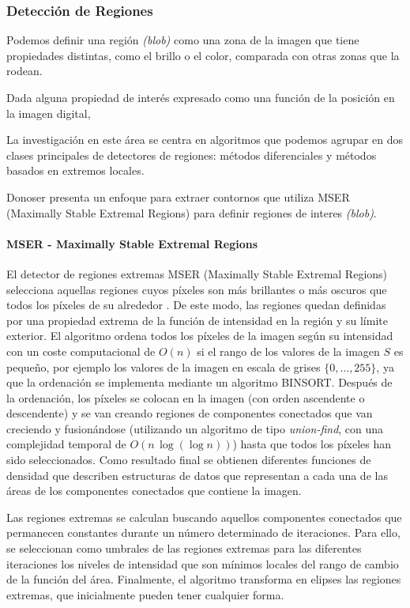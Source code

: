 \subsubsection{Detección de Regiones}
Podemos definir una región \emph{(blob)} como una zona de la imagen que tiene propiedades distintas, como el brillo o el color, comparada con otras zonas que la rodean.   

Dada alguna propiedad de interés expresado como una función de la posición en la imagen digital,

La investigación en este área se centra en algoritmos que podemos agrupar en dos clases principales de detectores de regiones: métodos diferenciales y métodos basados en extremos locales.

Donoser \cite{Donoser} presenta un enfoque para extraer contornos que utiliza MSER (Maximally Stable Extremal Regions) para definir regiones de interes \emph{(blob)}.

\paragraph{MSER - Maximally Stable Extremal Regions}
El detector de regiones extremas MSER (Maximally Stable Extremal Regions) selecciona aquellas regiones cuyos píxeles son más brillantes o más oscuros que todos los píxeles de su alrededor \cite{Matas}. De este modo, las regiones quedan definidas por una propiedad extrema de la función de intensidad en la región y su límite exterior. 
El algoritmo ordena todos los píxeles de la imagen según su intensidad con un coste computacional de $O(n)$ si el rango de los valores de la imagen $S$ es pequeño, por ejemplo los valores de la imagen en escala de grises $\lbrace 0,\ldots,255\rbrace$, ya que la ordenación se implementa mediante un algoritmo BINSORT. Después de la ordenación, los píxeles se colocan en la imagen (con orden ascendente o descendente) y se van creando regiones de componentes conectados que van creciendo y fusionándose (utilizando un algoritmo de tipo \emph{union-find}, con una complejidad temporal de $O(n\,\log(\log n))$) hasta que todos los píxeles han sido seleccionados. Como resultado final se obtienen diferentes funciones de densidad que describen estructuras de datos que representan a cada una de las áreas de los componentes conectados que contiene la imagen.

Las regiones extremas se calculan buscando aquellos componentes conectados que permanecen constantes durante un número determinado de iteraciones. Para ello, se seleccionan como umbrales de las regiones extremas para las diferentes iteraciones los niveles de intensidad que son mínimos locales del rango de cambio de la función del área. Finalmente, el algoritmo transforma en elipses las regiones extremas, que inicialmente pueden tener cualquier forma. 


